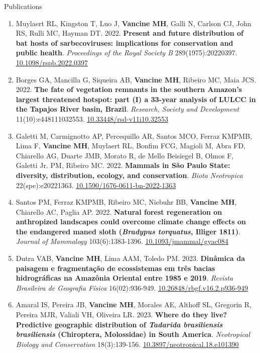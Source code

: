 \documentclass{resume}
\begin{document}
\begin{rSection}{Publications}
\begin{enumerate}
\item Muylaert RL, Kingston T, Luo J, \textbf{Vancine MH}, Galli N, Carlson CJ, John RS, Rulli MC, Hayman DT. 2022. \textbf{Present and future distribution of bat hosts of sarbecoviruses: implications for conservation and public health}. \textit{Proceedings of the Royal Society B} 289(1975):20220397. \href{https://doi.org/10.1098/rspb.2022.0397}{\underline{10.1098/rspb.2022.0397}}

\item Borges GA, Mancilla G, Siqueira AB, \textbf{Vancine MH}, Ribeiro MC, Maia JCS. 2022. \textbf{The fate of vegetation remnants in the southern Amazon’s largest threatened hotspot: part (I) a 33-year analysis of LULCC in the Tapajos River basin, Brazil}. \textit{Research, Society and Development} 11(10):e448111032553. \href{https://doi.org/10.33448/rsd-v11i10.32553}{\underline{10.33448/rsd-v11i10.32553}}

\item Galetti M, Carmignotto AP, Percequillo AR, Santos MCO, Ferraz KMPMB, Lima F, \textbf{Vancine MH}, Muylaert RL, Bonfim FCG, Magioli M, Abra FD, Chiarello AG, Duarte JMB, Morato R, de Mello Beisiegel B, Olmos F, Galetti Jr. PM, Ribeiro MC. 2022. \textbf{Mammals in São Paulo State: diversity, distribution, ecology, and conservation}. \textit{Biota Neotropica} 22(spe):e20221363. \href{https://doi.org/10.1590/1676-0611-bn-2022-1363}{\underline{10.1590/1676-0611-bn-2022-1363}}

\item Santos PM, Ferraz KMPMB, Ribeiro MC, Niebuhr BB, \textbf{Vancine MH}, Chiarello AC, Paglia AP. 2022. \textbf{Natural forest regeneration on anthropized landscapes could overcome climate change effects on the endangered maned sloth (\textbf{\textit{Bradypus torquatus}}, Illiger 1811)}. \textit{Journal of Mammalogy} 103(6):1383-1396. \href{https://doi.org/10.1093/jmammal/gyac084}{\underline{10.1093/jmammal/gyac084}}

\item Dutra VAB, \textbf{Vancine MH}, Lima AAM, Toledo PM. 2023. \textbf{Dinâmica da paisagem e fragmentação de ecossistemas em três bacias hidrográficas na Amazônia Oriental entre 1985 e 2019}. \textit{Revista Brasileira de Geografia Física} 16(02):936-949. \href{https://doi.org/10.26848/rbgf.v16.2.p936-949}{\underline{10.26848/rbgf.v16.2.p936-949}}

\item Amaral IS, Pereira JB, \textbf{Vancine MH}, Morales AE, Althoff SL, Gregorin R, Pereira MJR, Valiali VH, Oliveira LR. 2023. \textbf{Where do they live? Predictive geographic distribution of \textbf{\textit{Tadarida brasiliensis brasiliensis}} (Chiroptera, Molossidae) in South America}. \textit{Neotropical Biology and Conservation} 18(3):139-156. \href{https://doi.org/10.3897/neotropical.18.e101390}{\underline{10.3897/neotropical.18.e101390}}


\end{enumerate}
\end{rSection}
\end{document}
